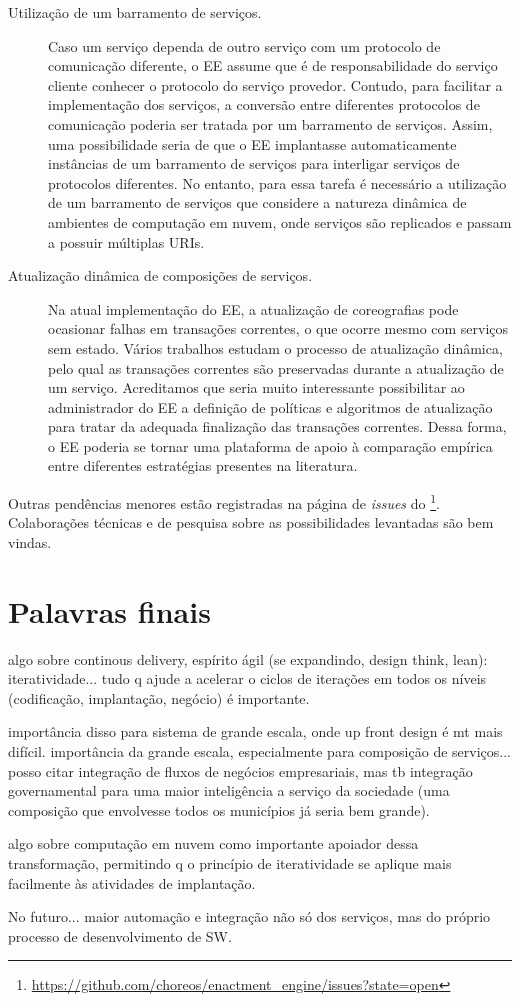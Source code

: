 \begin{description}
\item[Utilização de um barramento de serviços.] Caso um serviço dependa
de outro serviço com um protocolo de comunicação diferente, o EE assume que é de
responsabilidade do serviço cliente conhecer o protocolo do serviço provedor.
Contudo, para facilitar a implementação dos serviços, a conversão entre
diferentes protocolos de comunicação poderia ser tratada por um barramento de serviços.
Assim, uma possibilidade seria de que o EE implantasse automaticamente instâncias
de um barramento de serviços para interligar serviços de protocolos diferentes.
No entanto, para essa tarefa é necessário a utilização de um barramento de serviços
que considere a natureza dinâmica de ambientes de computação em nuvem,
onde serviços são replicados e passam a possuir múltiplas URIs.

\item[Atualização dinâmica de composições de serviços.] Na atual implementação do EE,
a atualização de coreografias pode ocasionar falhas em transações correntes,
o que ocorre mesmo com serviços sem estado.
Vários trabalhos \cite{Kramer1990Philosophers, Vandewoude2007Tranquility, Xiaoxing2011VersionConsistent} 
estudam o processo de atualização dinâmica, pelo qual as transações correntes 
são preservadas durante a atualização de um serviço. 
Acreditamos que seria muito interessante possibilitar ao administrador do EE
a definição de políticas e algoritmos de atualização para 
tratar da adequada finalização das transações correntes.
Dessa forma, o EE poderia se tornar uma plataforma de apoio
à comparação empírica entre diferentes estratégias presentes na literatura.

\end{description}

Outras pendências menores estão registradas na página de \emph{issues} 
do \ee\footnote{\url{https://github.com/choreos/enactment_engine/issues?state=open}}.
Colaborações técnicas e de pesquisa sobre as possibilidades levantadas
são bem vindas.


\section{Palavras finais}


algo sobre continous delivery, espírito ágil (se expandindo, design think, lean): iteratividade... 
tudo q ajude a acelerar o ciclos de iterações em todos os níveis
(codificação, implantação, negócio) é importante.

importância disso para sistema de grande escala, onde up front design é mt mais difícil.
importância da grande escala, especialmente para composição de serviços...
posso citar integração de fluxos de negócios empresariais,
mas tb integração governamental para uma maior inteligência a serviço da sociedade
(uma composição que envolvesse todos os municípios já seria bem grande).

algo sobre computação em nuvem como importante apoiador dessa transformação,
permitindo q o princípio de iteratividade se aplique mais facilmente
às atividades de implantação.

No futuro... maior automação e integração não só dos serviços,
mas do próprio processo de desenvolvimento de SW.



